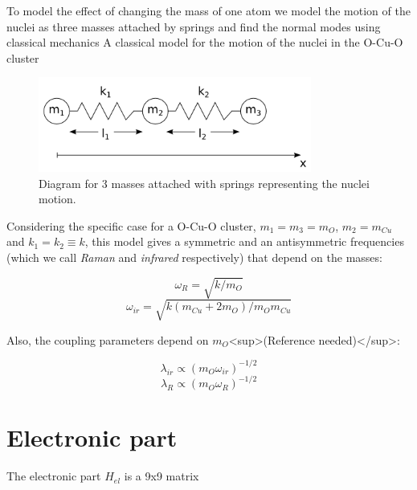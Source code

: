 To model the effect of changing the mass of one atom we model the motion of the nuclei as three masses attached by springs and find the normal modes using classical mechanics A classical model for the motion of the nuclei in the O-Cu-O cluster

\begin{figure}[ht!]
\centering
\includegraphics[width=0.8\textwidth]{images/3-masses-2-springs-linear.png}
\caption{Diagram for 3 masses attached with springs representing the nuclei motion.}
\label{fig:3-mases-2-springs}
\end{figure}

Considering the specific case for a O-Cu-O cluster, $m_1=m_3=m_O$, $m_2=m_{Cu}$ and $k_1=k_2\equiv k$, this model gives a symmetric and an antisymmetric frequencies (which we call \textit{Raman} and \textit{infrared} respectively) that depend on the masses: 

\begin{equation}\label{omegaR}\omega_{R}= \sqrt{k/m_O}\end{equation}
\begin{equation}\label{omegair}\omega_{ir} = \sqrt{k(m_{Cu}+2m_O)/m_Om_{Cu}}\end{equation}

Also, the coupling parameters depend on $m_O$<sup>(Reference needed)</sup>:

\begin{equation}\label{ir-coupl-isot}\lambda_{ir}\propto (m_O\omega_{ir})^{-1/2}\end{equation}
\begin{equation}\label{Ram-coupl-isot}\lambda_R\propto (m_O\omega_{R})^{-1/2}\end{equation}

\section{Electronic part}

The electronic part $H_{el}$ is a 9x9 matrix

